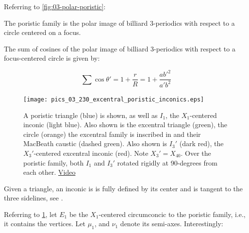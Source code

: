 
 
Referring to \cref{fig:03-polar-poristic}:

\begin{corollary}
The poristic family is the polar image of billiard 3-periodics with respect to a circle centered on a focus. 
\end{corollary}

\begin{corollary}
The sum of cosines of the polar image of billiard 3-periodics with respect to a focus-centered circle is given by:

\begin{equation}
\sum\cos\theta' = 1+\frac{r}{R} = 1+\frac{a b'^2}{a' b^2}
\label{eq:03-bic-cos}
\end{equation}
\end{corollary}

\begin{figure}
    \centering
    \texttt{[image: pics\_03\_230\_excentral\_poristic\_inconics.eps]}
    \caption{A poristic triangle (blue) is shown, as well as $I_1$, the $X_1$-centered inconic (light blue). Also shown is the excentral triangle (green), the circle (orange) the excentral family is inscribed in and their MacBeath caustic (dashed green). Also shown is $I_3'$ (dark red), the $X_3'$-centered excentral inconic (red). Note $X_3'=X_{40}$. Over the poristic family, both $I_1$ and $I_3'$ rotated rigidly at 90-degrees from each other. \href{https://youtu.be/hz0qEyVVvaI}{Video}}
    \label{fig:03-excentral-poristic-inconics}
\end{figure}

Given a triangle, an inconic is is fully defined by its center and is tangent to the three sidelines, see \cite[Inconic]{mw}.

Referring to \cref{fig:03-excentral-poristic-inconics}, let $E_1$ be the $X_1$-centered circumconcic to the poristic family, i.e., it contains the vertices. Let $\mu_1$, and $\nu_1$ denote its semi-axes. Interestingly:

